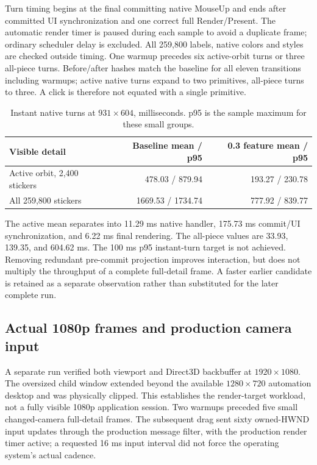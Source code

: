 \documentclass[a4paper,11pt]{article}
\begin{document}
Turn timing begins at the final committing native MouseUp and ends after committed UI synchronization and one correct full Render/Present. The automatic render timer is paused during each sample to avoid a duplicate frame; ordinary scheduler delay is excluded. All 259,800 labels, native colors and styles are checked outside timing. One warmup precedes six active-orbit turns or three all-piece turns. Before/after hashes match the baseline for all eleven transitions including warmups; active native turns expand to two primitives, all-piece turns to three. A click is therefore not equated with a single primitive.

\begin{table}[htbp]
\centering\small
\caption{Instant native turns at \(931\times604\), milliseconds. p95 is the sample maximum for these small groups.}
\label{tab:turn03}
\begin{tabularx}{\linewidth}{@{}Xrr@{}}
\toprule
\textbf{Visible detail} & \textbf{Baseline mean / p95} & \textbf{0.3 feature mean / p95}\\
\midrule
Active orbit, 2,400 stickers & 478.03 / 879.94 & 193.27 / 230.78\\
All 259,800 stickers & 1669.53 / 1734.74 & 777.92 / 839.77\\
\bottomrule
\end{tabularx}
\end{table}

The active mean separates into 11.29 ms native handler, 175.73 ms commit/UI synchronization, and 6.22 ms final rendering. The all-piece values are 33.93, 139.35, and 604.62 ms. The 100 ms p95 instant-turn target is not achieved. Removing redundant pre-commit projection improves interaction, but does not multiply the throughput of a complete full-detail frame. A faster earlier candidate is retained as a separate observation rather than substituted for the later complete run.

\subsection{Actual 1080p frames and production camera input}

A separate run verified both viewport and Direct3D backbuffer at \(1920\times1080\). The oversized child window extended beyond the available \(1280\times720\) automation desktop and was physically clipped. This establishes the render-target workload, not a fully visible 1080p application session. Two warmups preceded five small changed-camera full-detail frames. The subsequent drag sent sixty owned-HWND input updates through the production message filter, with the production render timer active; a requested 16 ms input interval did not force the operating system's actual cadence.
\end{document}
